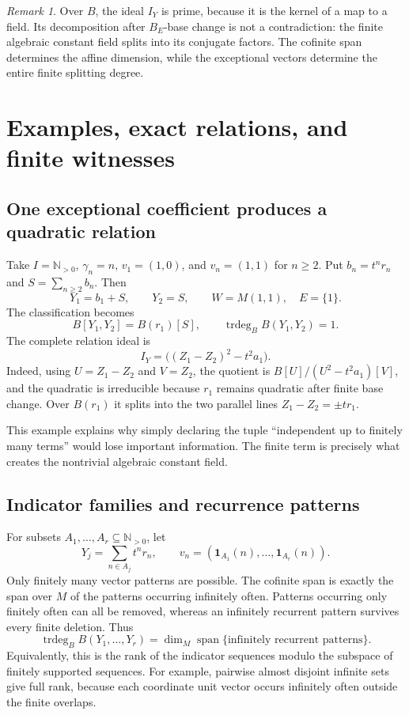 \documentclass[11pt,a4paper]{article}
\numberwithin{equation}{section}
\theoremstyle{definition}
\theoremstyle{remark}
\newtheorem{remark}[theorem]{Remark}
\newcommand{\N}{\mathbb N}
\newcommand{\Span}{\operatorname{span}}
\newcommand{\trdeg}{\operatorname{trdeg}}
\begin{document}
\begin{remark}
Over $B$, the ideal $I_Y$ is prime, because it is the kernel of a map to
a field. Its decomposition after $B_E$-base change is not a contradiction:
the finite algebraic constant field splits into its conjugate factors.
The cofinite span determines the affine dimension, while the exceptional
vectors determine the entire finite splitting degree.
\end{remark}

\section{Examples, exact relations, and finite witnesses}\label{tail:sec:examples}

\subsection{One exceptional coefficient produces a quadratic relation}
Take $I=\N_{>0}$, $\gamma_n=n$, $v_1=(1,0)$, and $v_n=(1,1)$ for
$n\geq2$. Put $b_n=t^nr_n$ and $S=\sum_{n\geq2}b_n$. Then
\[
 Y_1=b_1+S,\qquad Y_2=S,\qquad
 W=M(1,1),\quad E=\{1\}.
\]
The classification becomes
\[
 B[Y_1,Y_2]=B(r_1)[S],\qquad \trdeg_B B(Y_1,Y_2)=1.
\]
The complete relation ideal is
\begin{equation}\label{tail:eq:quadraticexample}
 I_Y=\bigl((Z_1-Z_2)^2-t^2a_1\bigr).
\end{equation}
Indeed, using $U=Z_1-Z_2$ and $V=Z_2$, the quotient is
$B[U]/(U^2-t^2a_1)[V]$, and the quadratic is irreducible because $r_1$
remains quadratic after finite base change. Over $B(r_1)$ it splits into
the two parallel lines $Z_1-Z_2=\pm tr_1$.

This example explains why simply declaring the tuple ``independent up to
finitely many terms'' would lose important information. The finite term
is precisely what creates the nontrivial algebraic constant field.

\subsection{Indicator families and recurrence patterns}
For subsets $A_1,\ldots,A_r\subseteq\N_{>0}$, let
\[
 Y_j=\sum_{n\in A_j}t^nr_n,\qquad
 v_n=(\mathbf1_{A_1}(n),\ldots,\mathbf1_{A_r}(n)).
\]
Only finitely many vector patterns are possible. The cofinite span is
exactly the span over $M$ of the patterns occurring infinitely often.
Patterns occurring only finitely often can all be removed, whereas an
infinitely recurrent pattern survives every finite deletion. Thus
\[
 \trdeg_B B(Y_1,\ldots,Y_r)
   =\dim_M\Span\{\text{infinitely recurrent patterns}\}.
\]
Equivalently, this is the rank of the indicator sequences modulo the
subspace of finitely supported sequences. For example, pairwise almost
disjoint infinite sets give full rank, because each coordinate unit vector
occurs infinitely often outside the finite overlaps.
\end{document}
